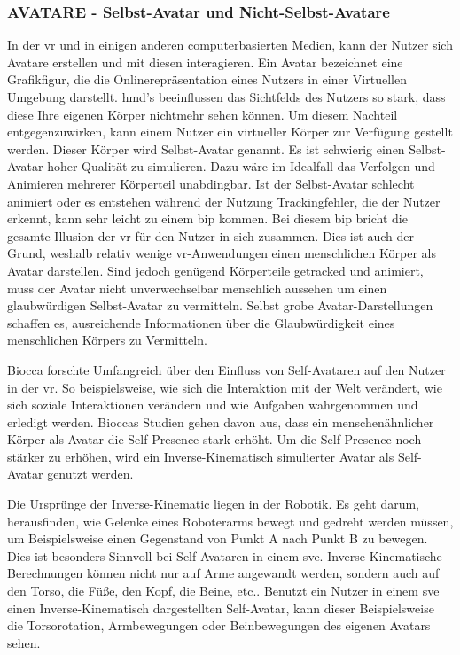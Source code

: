 \documentclass[a4paper,11pt]{article}%
\renewcommand{\\}{\vspace*{0.5\baselineskip} \newline}
\begin{document}
		\subsubsection{AVATARE - Selbst-Avatar und Nicht-Selbst-Avatare}

In der \ac{vr} und in einigen anderen computerbasierten Medien, kann der Nutzer sich Avatare erstellen und mit diesen interagieren. Ein Avatar bezeichnet eine Grafikfigur, die die Onlinerepräsentation eines Nutzers in einer Virtuellen Umgebung darstellt. \citep[p.1]{neustaedter2009presenting} \\
\ac{hmd}'s beeinflussen das Sichtfelds des Nutzers so stark, dass diese Ihre eigenen Körper nichtmehr sehen können. Um diesem Nachteil entgegenzuwirken, kann einem Nutzer ein virtueller Körper zur Verfügung gestellt werden. Dieser Körper wird Selbst-Avatar genannt.
Es ist schwierig einen Selbst-Avatar hoher Qualität zu simulieren. Dazu wäre im Idealfall das Verfolgen und Animieren mehrerer Körperteil unabdingbar. Ist der Selbst-Avatar schlecht animiert oder es entstehen während der Nutzung Trackingfehler, die der Nutzer erkennt, kann sehr leicht zu einem \ac{bip} kommen. Bei diesem \ac{bip} bricht die gesamte Illusion der \ac{vr} für den Nutzer in sich zusammen. 
Dies ist auch der Grund, weshalb relativ wenige \ac{vr}-Anwendungen einen menschlichen Körper als Avatar darstellen.
Sind jedoch genügend Körperteile getracked und animiert, muss der Avatar nicht unverwechselbar menschlich aussehen um einen glaubwürdigen Selbst-Avatar zu vermitteln. Selbst grobe Avatar-Darstellungen schaffen es, ausreichende Informationen über die Glaubwürdigkeit eines menschlichen Körpers zu Vermitteln. \citep{lok2003effects}

Biocca forschte Umfangreich über den Einfluss von Self-Avataren auf den Nutzer in der \ac{vr}. \citep[421-427]{construal2014connected} 
\newline So beispielsweise, wie sich die Interaktion mit der Welt verändert, wie sich soziale Interaktionen verändern und wie Aufgaben wahrgenommen und erledigt werden. \citep{benford1995user} \citep{bowers1996talk}
Bioccas Studien gehen davon aus, dass ein menschenähnlicher Körper als Avatar die Self-Presence stark erhöht. Um die Self-Presence noch stärker zu erhöhen, wird ein Inverse-Kinematisch simulierter Avatar als Self-Avatar genutzt werden.

Die Ursprünge der Inverse-Kinematic liegen in der Robotik. Es geht darum, herausfinden, wie Gelenke eines Roboterarms bewegt und gedreht werden müssen, um Beispielsweise einen Gegenstand von Punkt A nach Punkt B zu bewegen. Dies ist besonders Sinnvoll bei Self-Avataren in einem \ac{sve}. Inverse-Kinematische Berechnungen können nicht nur auf Arme angewandt werden, sondern auch auf den Torso, die Füße, den Kopf, die Beine, etc.. Benutzt ein Nutzer in einem \ac{sve} einen Inverse-Kinematisch dargestellten Self-Avatar, kann dieser Beispielsweise die Torsorotation, Armbewegungen oder Beinbewegungen des eigenen Avatars sehen.
\end{document}
